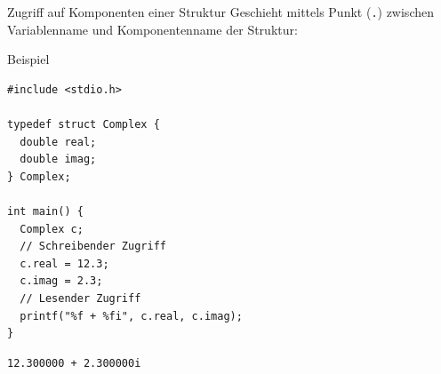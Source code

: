 \documentclass[presentation]{beamer}
\begin{document}
\begin{frame}[label={sec:orgc05ede9},fragile]{Zugriff auf Komponenten einer Struktur}
 Geschieht mittels Punkt ({\color{solarizedYellow}\texttt{.}}) zwischen Variablenname und
Komponentenname der Struktur:
\begin{exampleblock}{Beispiel}
\begin{verbatim}
#include <stdio.h>

typedef struct Complex {
  double real;
  double imag;
} Complex;

int main() {
  Complex c;
  // Schreibender Zugriff
  c.real = 12.3;
  c.imag = 2.3;
  // Lesender Zugriff
  printf("%f + %fi", c.real, c.imag);
}
\end{verbatim}

\begin{verbatim}
12.300000 + 2.300000i
\end{verbatim}
\end{exampleblock}
\end{frame}
\end{document}
